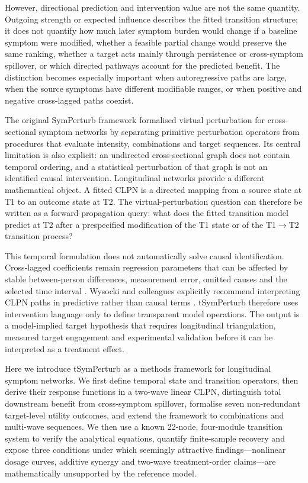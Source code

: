 \documentclass[11pt]{article}
\begin{document}
However, directional prediction and intervention value are not the same
quantity. Outgoing strength or expected influence describes the fitted
transition structure; it does not quantify how much later symptom burden
would change if a baseline symptom were modified, whether a feasible
partial change would preserve the same ranking, whether a target acts
mainly through persistence or cross-symptom spillover, or which directed
pathways account for the predicted benefit. The distinction becomes
especially important when autoregressive paths are large, when the
source symptoms have different modifiable ranges, or when positive and
negative cross-lagged paths coexist.

The original SymPerturb framework formalised virtual perturbation for
cross-sectional symptom networks by separating primitive perturbation
operators from procedures that evaluate intensity, combinations and
target sequences. Its central limitation is also explicit: an undirected
cross-sectional graph does not contain temporal ordering, and a
statistical perturbation of that graph is not an identified causal
intervention. Longitudinal networks provide a different mathematical
object. A fitted CLPN is a directed mapping from a source state at T1 to
an outcome state at T2. The virtual-perturbation question can therefore
be written as a forward propagation query: what does the fitted
transition model predict at T2 after a prespecified modification of the
T1 state or of the T1\(\rightarrow\)T2 transition process?

This temporal formulation does not automatically solve causal
identification. Cross-lagged coefficients remain regression parameters
that can be affected by stable between-person differences, measurement
error, omitted causes and the selected time interval \cite{ref5,ref6}. Wysocki
and colleagues explicitly recommend interpreting CLPN paths in
predictive rather than causal terms \cite{ref3}. tSymPerturb therefore uses
intervention language only to define transparent model operations. The
output is a model-implied target hypothesis that requires longitudinal
triangulation, measured target engagement and experimental validation
before it can be interpreted as a treatment effect.

Here we introduce tSymPerturb as a methods framework for longitudinal
symptom networks. We first define temporal state and transition
operators, then derive their response functions in a two-wave linear
CLPN, distinguish total downstream benefit from cross-symptom spillover,
formalise seven non-redundant target-level utility outcomes, and extend
the framework to combinations and multi-wave sequences. We then use a
known 22-node, four-module transition system to verify the analytical
equations, quantify finite-sample recovery and expose three conditions
under which seemingly attractive findings---nonlinear dosage curves,
additive synergy and two-wave treatment-order claims---are
mathematically unsupported by the reference model.
\end{document}
